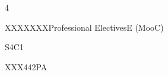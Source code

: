 \documentclass[a4paper]{syllabus}
\begin{document}
	\begin{semester}{4}
		\begin{electivegroup}{XXXXXXX}{Professional Electives}{E (MooC)}
		\begin{definecourse}{S4C1}
		\end{definecourse}
		
		
		
		\end{electivegroup}
		
		\begin{definecourse}{XXX442PA}
		\end{definecourse}
		
	\end{semester}
\end{document}
